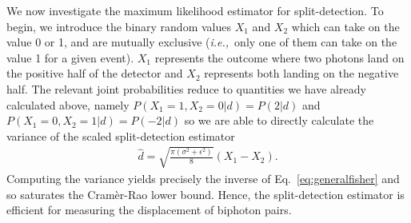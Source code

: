 We now investigate the maximum likelihood estimator for split-detection.
To begin, we introduce the binary random values $X_1$ and $X_2$ which can take on the value 0 or 1, and are mutually exclusive (\emph{i.e.,}~only one of them can take on the value 1 for a given event).  
$X_1$ represents the outcome where two photons land on the positive half of the detector and $X_2$ represents both landing on the negative half.
The relevant joint probabilities reduce to quantities we have already calculated above, namely $P(X_1 = 1, X_2 = 0|d) = P(2|d)$ and $P(X_1 = 0, X_2 = 1|d) = P(-2|d)$ so we are able to directly calculate the variance of the scaled split-detection estimator  
\begin{align}
	\hat{d} = \sqrt{\frac{\pi (\sigma^2 + \epsilon^2)}{8}} \left(X_1 - X_2\right).
\end{align}
Computing the variance yields precisely the inverse of Eq.~\eqref{eq:generalfisher} and so saturates the Cram\`{e}r-Rao lower bound. 
Hence, the split-detection estimator is efficient for measuring the displacement of biphoton pairs.

